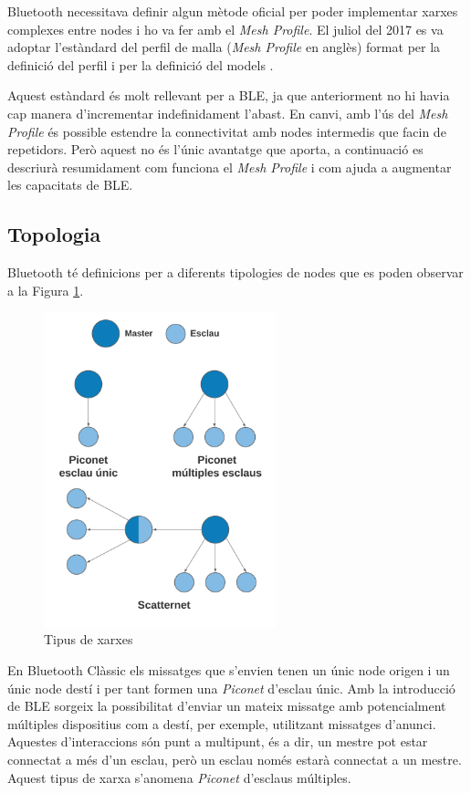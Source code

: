 Bluetooth necessitava definir algun mètode oficial per poder implementar xarxes complexes entre nodes i ho va fer amb el \textit{Mesh Profile}.
El juliol del 2017 es va adoptar l'estàndard del perfil de malla (\textit{Mesh Profile} en anglès) format per la definició del perfil \cite{Mesh Profile Definition} i per la definició del models \cite{Mesh Profile Models}.

Aquest estàndard és molt rellevant per a BLE, ja que anteriorment no hi havia cap manera d'incrementar indefinidament l'abast.
En canvi, amb l'ús del \textit{Mesh Profile} és possible estendre la connectivitat amb nodes intermedis que facin de repetidors.
Però aquest no és l'únic avantatge que aporta, a continuació es descriurà resumidament com funciona el \textit{Mesh Profile} i com ajuda a augmentar les capacitats de BLE.

\subsection{Topologia}
Bluetooth té definicions per a diferents tipologies de nodes que es poden observar a la Figura \ref{piconet}.

\begin{figure}[!h]
	\begin{center}
		\includegraphics[width=0.6\textwidth]{./images/PICONET.png}
		\caption{Tipus de xarxes}
		\label{piconet}
	\end{center}
\end{figure}

En Bluetooth Clàssic els missatges que s'envien tenen un únic node origen i un únic node destí i per tant formen una \textit{Piconet} d'esclau únic.
Amb la introducció de BLE sorgeix la possibilitat d'enviar un mateix missatge amb potencialment múltiples dispositius com a destí, per exemple, utilitzant missatges d'anunci.
Aquestes d'interaccions són punt a multipunt, és a dir, un mestre pot estar connectat a més d'un esclau, però un esclau només estarà connectat a un mestre.
Aquest tipus de xarxa s'anomena \textit{Piconet} d'esclaus múltiples.

